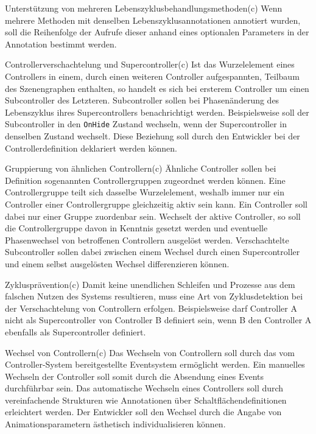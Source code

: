 \begin{freq}{Unterstützung von mehreren Lebenszyklusbehandlungsmethoden}(c)
	Wenn mehrere Methoden mit denselben Lebenszyklusannotationen annotiert wurden, soll die Reihenfolge der Aufrufe dieser anhand eines optionalen Parameters in der Annotation bestimmt werden.
\end{freq}
\begin{freq}{Controllerverschachtelung und Supercontroller}(c)
	Ist das Wurzelelement eines Controllers in einem, durch einen weiteren Controller aufgespannten, Teilbaum des Szenengraphen enthalten, so handelt es sich bei ersterem Controller um einen Subcontroller des Letzteren. Subcontroller sollen bei Phasenänderung des Lebenszyklus ihres Supercontrollers benachrichtigt werden. Beispielsweise soll der Subcontroller in den \texttt{OnHide} Zustand wechseln, wenn der Supercontroller in denselben Zustand wechselt. Diese Beziehung soll durch den Entwickler bei der Controllerdefinition deklariert werden können.
\end{freq}
\begin{freq}{Gruppierung von ähnlichen Controllern}(c)
	Ähnliche Controller sollen bei Definition sogenannten Controllergruppen zugeordnet werden können. Eine Controllergruppe teilt sich dasselbe Wurzelelement, weshalb immer nur ein Controller einer Controllergruppe gleichzeitig aktiv sein kann. Ein Controller soll dabei nur einer Gruppe zuordenbar sein. Wechselt der aktive Controller, so soll die Controllergruppe davon in Kenntnis gesetzt werden und eventuelle Phasenwechsel von betroffenen Controllern ausgelöst werden. Verschachtelte Subcontroller sollen dabei zwischen einem Wechsel durch einen Supercontroller und einem selbst ausgelösten Wechsel differenzieren können.
\end{freq}
\begin{freq}{Zyklusprävention}(c)
	Damit keine unendlichen Schleifen und Prozesse aus dem falschen Nutzen des Systems resultieren, muss eine Art von Zyklusdetektion bei der Verschachtelung von Controllern erfolgen. Beispielsweise darf Controller A nicht als Supercontroller von Controller B definiert sein, wenn B den Controller A ebenfalls als Supercontroller definiert.
\end{freq}
\begin{freq}{Wechsel von Controllern}(c)
	Das Wechseln von Controllern soll durch das vom Controller-System bereitgestellte Eventsystem ermöglicht werden. Ein manuelles Wechseln der Controller soll somit durch die Absendung eines Events durchführbar sein. Das automatische Wechseln eines Controllers soll durch vereinfachende Strukturen wie Annotationen über Schaltflächendefinitionen erleichtert werden. Der Entwickler soll den Wechsel durch die Angabe von Animationsparametern ästhetisch individualisieren können.
\end{freq}

